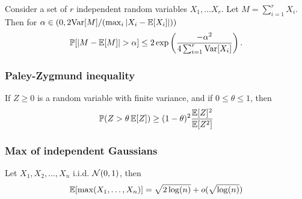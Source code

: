 \documentclass[10pt]{article}
\begin{document}
  Consider a set of $r$ independent random variables $X_1, \dots X_r$. Let $M = \sum_{i=1}^r X_i$. Then for $\alpha \in (0,2 \mathrm{Var} [M] / (\max_i |X_i - \mathop{\mathbb{E} \displaystyle} [X_i]|)) $
\begin{equation}
\mathbb{P} [ \left|M - \mathop{\mathbb{E} \displaystyle} [M]\right| > \alpha] \leq 2 \exp \left( \frac{- \alpha^2}{4 \sum_{i=1}^r \mathrm{Var} [X_i]} \right). 
\end{equation}

\subsubsection{Paley-Zygmund inequality}  
If $Z \geq 0$ is a random variable with finite variance, and if $0 \leq \theta \leq 1$, then 
\begin{equation}
    \mathbb{P}({Z > \theta \mathop{\mathbb{E} \displaystyle}[Z]}) \geq (1- \theta)^2 \frac{\mathop{\mathbb{E} \displaystyle} [Z]^2}{\mathop{\mathbb{E} \displaystyle}[Z^2]}
\end{equation}
\subsubsection{Max of independent Gaussians}
Let $X_1, X_2, \dots, X_n$ i.i.d. $\mathcal{N}(0,1)$, then
\begin{equation}
    \mathop{\mathbb{E} \displaystyle}[ \max(X_1, \dots, X_n)] = \sqrt{2 \log (n)} + o (\sqrt{\log (n)})
\end{equation}
\end{document}
